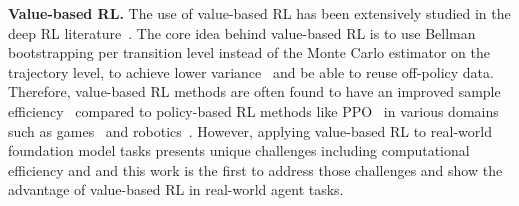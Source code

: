 \textbf{Value-based RL.} The use of value-based RL
has been extensively studied in the deep RL literature~\citep{haarnoja2018softactorcriticoffpolicymaximum, fujimoto2018addressingfunctionapproximationerror, kumar2020conservativeqlearningofflinereinforcement, kostrikov2021offlinereinforcementlearningimplicit, mnih2013playingatarideepreinforcement}.
The core idea behind value-based RL is to use Bellman bootstrapping per transition level instead of the Monte Carlo estimator on the trajectory level, to achieve lower variance~\citep{schulman2018highdimensionalcontinuouscontrolusing} and be able to reuse off-policy data.
Therefore, value-based RL methods are often found to have an improved sample efficiency~\citep{haarnoja2019softactorcriticalgorithmsapplications} compared to policy-based RL methods like PPO~\citep{schulman2017proximalpolicyoptimizationalgorithms} in various domains such as games~\citep{mnih2013playingatarideepreinforcement} and robotics~\citep{haarnoja2018softactorcriticoffpolicymaximum}. However, applying value-based RL to real-world foundation model tasks presents unique challenges including computational efficiency and  and this work is the first to address those challenges and show the advantage of value-based RL in real-world agent tasks.
\fi
